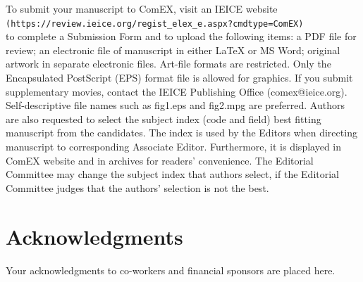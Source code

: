 \documentclass{comex}
\begin{document}
To submit your manuscript to ComEX, visit an IEICE website \\
\verb+(https://review.ieice.org/regist_elex_e.aspx?cmdtype=ComEX)+ \\
to complete a Submission Form and to upload the following items: a PDF
file for review; an electronic file of manuscript in either \LaTeX{} or
MS Word; original artwork in separate electronic files. 
Art-file formats are restricted. Only the Encapsulated PostScript
(EPS) format file is allowed for graphics. 
If you submit supplementary movies, contact the IEICE Publishing Office (comex@ieice.org). 
Self-descriptive file names such as fig1.eps and fig2.mpg are preferred.
Authors are also requested to
select the subject index (code and field) best fitting manuscript from
the candidates. The index is used by the Editors when
directing manuscript to corresponding Associate Editor. Furthermore, it
is displayed in ComEX website and in archives for readers'
convenience. The Editorial Committee may change the subject index that
authors select, if the Editorial Committee judges that the authors'
selection is not the best.

\section*{Acknowledgments}

Your acknowledgments to co-workers and financial sponsors are placed here.
\end{document}
